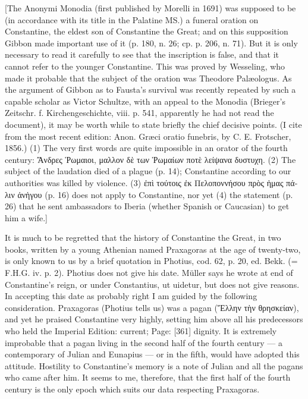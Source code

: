 [The Anonymi Monodia (first published by Morelli in 1691) was supposed to be (in accordance with its title in the Palatine MS.) a funeral oration on Constantine, the eldest son of Constantine the Great; and on this supposition Gibbon made important use of it (p. 180, n. 26; cp. p. 206, n. 71). But it is only necessary to read it carefully to see that the inscription is false, and that it cannot refer to the younger Constantine. This was proved by Wesseling, who made it probable that the subject of the oration was Theodore Palæologus. As the argument of Gibbon as to Fausta\texthebrew{}’s survival was recently repeated by such a capable scholar as Victor Schultze, with an appeal to the Monodia (Brieger\texthebrew{}’s Zeitschr. f. Kirchengeschichte, viii. p. 541, apparently he had not read the document), it may be worth while to state briefly the chief decisive points. (I cite from the most recent edition: Anon. Græci oratio funebris, by C. E. Frotscher, 1856.) (1) The very first words are quite impossible in an orator of the fourth century: \textgreek{\texthebrew{Ἄ}νδρες \texthebrew{Ῥ}ωμαιοι, μαλλον δ\texthebrew{ὲ} των \texthebrew{Ῥ}ωμαίων ποτ\texthebrew{ὲ} λείψανα δυστυχη}. (2) The subject of the laudation died of a plague (p. 14); Constantine according to our authorities was killed by violence. (3) \textgreek{\texthebrew{ἐ}π\texthebrew{ὶ} τούτοις \texthebrew{ἐ}κ Πελοποννήσου πρ\texthebrew{ὸ}ς \texthebrew{ἡ}μας πάλιν \texthebrew{ἀ}ν\texthebrew{ἡ}γου} (p. 16) does not apply to Constantine, nor yet (4) the statement (p. 26) that he sent ambassadors to Iberia (whether Spanish or Caucasian) to get him a wife.]

It is much to be regretted that the history of Constantine the Great, in two books, written by a young Athenian named Praxagoras at the age of twenty-two, is only known to us by a brief quotation in Photius, cod. 62, p. 20, ed. Bekk. (= F.H.G. iv. p. 2). Photius does not give his date. Müller says he wrote at end of Constantine\texthebrew{}’s reign, or under Constantius, ut uidetur, but does not give reasons. In accepting this date as probably right I am guided by the following consideration. Praxagoras (Photius tells us) was a pagan (\textgreek{\texthebrew{Ἕ}λλην τ\texthebrew{ὴ}ν θρησκείαν}), and yet he praised Constantine very highly, setting him above all his predecessors who held the Imperial Edition: current; Page: [361] dignity. It is extremely improbable that a pagan living in the second half of the fourth century \texthebrew{—} a contemporary of Julian and Eunapius \texthebrew{—} or in the fifth, would have adopted this attitude. Hostility to Constantine\texthebrew{}’s memory is a note of Julian and all the pagans who came after him. It seems to me, therefore, that the first half of the fourth century is the only epoch which suits our data respecting Praxagoras.

